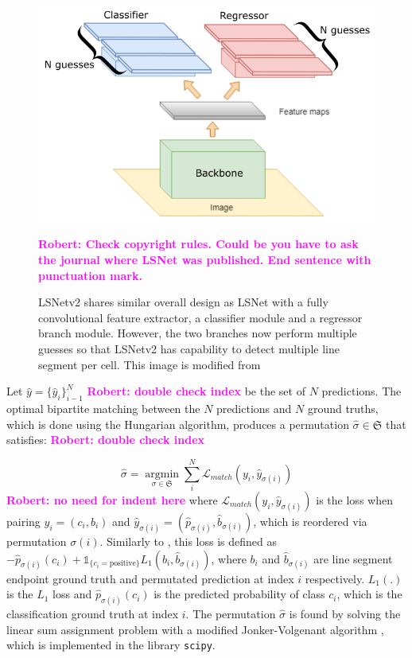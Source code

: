 \documentclass[journal]{IEEEtran}
\newcommand{\commentR}[1]{\textbf{\textcolor{magenta}{Robert: #1}}}
\begin{document}
\begin{figure}
  \includegraphics[width=\linewidth]{imgs/others/2.png}
  \caption{LSNetv2 shares similar overall design as LSNet with a fully convolutional feature extractor, a classifier module and a regressor branch module. However, the two branches now perform multiple guesses so that LSNetv2 has capability to detect multiple line segment per cell. This image is modified from \cite{Nguyen2020}} \commentR{Check copyright rules. Could be you have to ask the journal where LSNet was published. End sentence with punctuation mark.}
  \label{lsnet_architecture}
\end{figure}

Let $\hat{y}=\{\hat{y}_i\}^N_{i-1}$ \commentR{double check index} be the set of $N$ predictions. The optimal bipartite matching between the $N$ predictions and $N$ ground truths, which is done using the Hungarian algorithm, produces a permutation $\hat{\sigma} \in \mathfrak{S}$ that satisfies: \commentR{double check index}

\begin{equation} \label{bipartite_eqn}
\hat{\sigma} = \mathop{\arg \min}\limits_{\sigma \in \mathfrak{S}} \sum_i^N \mathcal{L}_{match} (y_i, \hat{y}_{\sigma(i)})
\end{equation}
\commentR{no need for indent here}
where $\mathcal{L}_{match} (y_i, \hat{y}_{\sigma(i)})$ is the loss when pairing $y_i = (c_i, b_i)$ and $\hat{y}_{\sigma(i)} = (\hat{p}_{\sigma(i)}, \hat{b}_{\sigma(i)})$, which is reordered via permutation $\sigma(i)$. Similarly to \cite{DETR}, this loss is defined as $-\hat{p}_{\sigma(i)}(c_i) + \mathds{1}_{\{c_i=\text{positive}\}}L_1(b_i, \hat{b}_{\sigma(i)})$, where $b_i$ and $\hat{b}_{\sigma(i)}$ are line segment endpoint ground truth and permutated prediction at index $i$ respectively. $L_1(.)$ is the $L_1$ loss and $\hat{p}_{\sigma(i)}(c_i)$ is the predicted probability of class $c_i$, which is the classification ground truth at index $i$. The permutation $\hat{\sigma}$ is found by solving the linear sum assignment problem with a modified Jonker-Volgenant algorithm \cite{7738348}, which is implemented in the library \texttt{scipy}.
\end{document}
